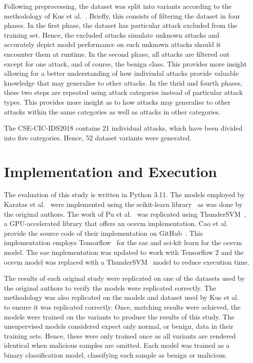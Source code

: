 Following preprocessing, the dataset was split into variants according to the
methodology of Kus et al.~\cite{Kus}. Briefly, this consists of filtering the
dataset in four phases. In the first phase, the dataset has particular attack
excluded from the training set. Hence, the excluded attacks simulate unknown
attacks and accurately depict model performance on such unknown attacks should
it encounter them at runtime. In the second phase, all attacks are filtered out
except for one attack, and of course, the benign class. This provides more
insight allowing for a better understanding of how indiviudal attacks provide
valuable knowledge that may generalise to other attacks. In the thrid and
fourth phases, these two steps are repeated using attack categories instead of
particular attack types. This provides more insight as to how attacks may
generalise to other attacks within the same categories as well as attacks in
other categories.

The CSE-CIC-IDS2018 contains 21 individual attacks, which have been divided
into five categories. Hence, 52 dataset variants were generated.

\section{Implementation and Execution}%
\label{sec:implementation}

The evaluation of this study is written in Python 3.11. The models employed by
Karatas et al.~\cite{Karatas} were implemented using the scikit-learn
library~\cite{scikit-learn} as was done by the original authors. The work of Pu
et al.~\cite{Pu} was replicated using ThunderSVM~\cite{ThunderSVM}, a
GPU-accelerated library that offers an \gls{ocsvm} implementation. Cao et
al.~\cite{Cao} provide the source code of their implementation on
GitHub~\cite{cao_git}. This implementation employs Tensorflow~\cite{tensorflow}
for the \gls{sae} and sci-kit learn for the \gls{ocsvm} model. The \gls{sae}
implementation was updated to work with Tensorflow 2 and the \gls{ocsvm} model
was replaced with a ThunderSVM~\cite{ThunderSVM} model to reduce execution
time.

The results of each original study were replicated on one of the datasets used
by the original authors to verify the models were replicated correctly. The
methodology was also replicated on the models and dataset used by Kus et
al.~\cite{Kus} to ensure it was replicated correctly. Once, matching results
were achieved, the models were trained on the variants to produce the results
of this study. The unsupervised models considered expect only normal, or
benign, data in their training sets. Hence, these were only trained once as all
variants are rendered identical when malicious samples are omitted. Each model
was trained as a binary classification model, classifying each sample as benign
or malicious.


